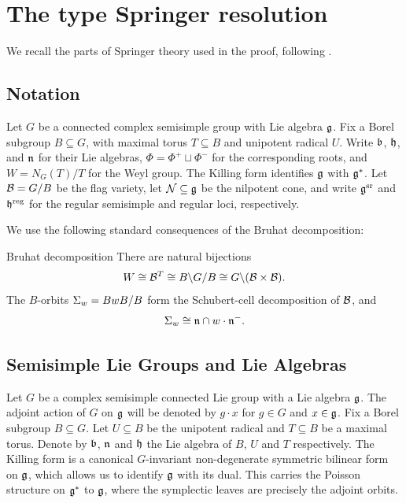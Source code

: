 \section{The type  Springer resolution}
\label{chapter_springer}

We recall the parts of Springer theory used in the proof, following
\cite{chriss1997representation}.

\subsection{Notation}

Let $G$ be a connected complex semisimple group with Lie algebra
$\mathfrak{g}$. Fix a Borel subgroup $B\subseteq G$, with maximal torus
$T\subseteq B$ and unipotent radical $U$. Write $\mathfrak{b}$, $\mathfrak{h}$,
and $\mathfrak{n}$ for their Lie algebras, $\Phi=\Phi^+\sqcup\Phi^-$ for the
corresponding roots, and $W=N_G(T)/T$ for the Weyl group. The Killing
form identifies $\mathfrak{g}$ with $\mathfrak{g}^*$. Let $\mathcal{B}=G/B$ be the
flag variety, let $\mathcal{N}\subseteq\mathfrak{g}$ be the nilpotent cone, and
write $\mathfrak{g}^{\mathrm{sr}}$ and $\mathfrak{h}^{\mathrm{reg}}$ for the
regular semisimple and regular loci, respectively.

We use the following standard consequences of the Bruhat decomposition:
\begin{lemma}{Bruhat decomposition}
  There are natural bijections
  \[
    W\cong\mathcal{B}^T\cong B\backslash G/B
    \cong G\backslash(\mathcal{B}\times\mathcal{B}).
  \]
  The $B$-orbits $\Sigma_w=BwB/B$ form the Schubert-cell
  decomposition of $\mathcal{B}$, and
  \[
    \Sigma_w\cong\mathfrak{n}\cap w\cdot\mathfrak{n}^-.
  \]
\end{lemma}

\iffalse

\subsection{Semisimple Lie Groups and Lie Algebras}

Let $G$ be a complex semisimple connected Lie group with a Lie algebra $\mathfrak{g}$. The adjoint action of $G$ on $\mathfrak{g}$ will be denoted by $g \cdot x$ for $g \in G$ and $x \in \mathfrak{g}$. Fix a Borel subgroup $B \subseteq G$. Let $U \subseteq B$ be the unipotent radical and $T \subseteq B$ be a maximal torus. Denote by $\mathfrak{b}$, $\mathfrak{n}$ and $\mathfrak{h}$ the Lie algebra of $B$, $U$ and $T$ respectively. The Killing form is a canonical $G$-invariant non-degenerate symmetric bilinear form on $\mathfrak{g}$, which allows us to identify $\mathfrak{g}$ with its dual. This carries the Poisson structure on $\mathfrak{g}^*$ to $\mathfrak{g}$, where the symplectic leaves are precisely the adjoint orbits.

